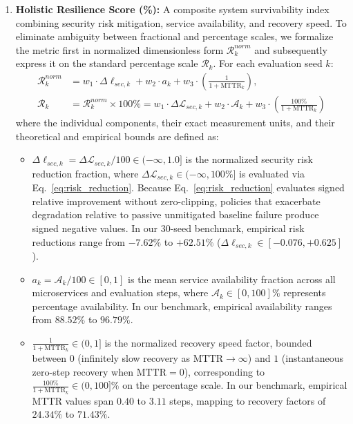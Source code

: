 \documentclass[ASNA,twocolumn]{USG}
\begin{document}
\begin{enumerate}
    \item \textbf{Holistic Resilience Score (\%):} A composite system survivability index combining security risk mitigation, service availability, and recovery speed. To eliminate ambiguity between fractional and percentage scales, we formalize the metric first in normalized dimensionless form $\mathcal{R}_k^{norm}$ and subsequently express it on the standard percentage scale $\mathcal{R}_k$. For each evaluation seed $k$:
    \begin{align}
        \mathcal{R}_k^{norm} &= w_1 \cdot \Delta \ell_{sec, k} + w_2 \cdot a_k + w_3 \cdot \left(\frac{1}{1 + \text{MTTR}_k}\right), \label{eq:resilience_norm} \\
        \mathcal{R}_k &= \mathcal{R}_k^{norm} \times 100\% = w_1 \cdot \Delta \mathcal{L}_{sec, k} + w_2 \cdot \mathcal{A}_k + w_3 \cdot \left(\frac{100\%}{1 + \text{MTTR}_k}\right) \label{eq:resilience_pct}
    \end{align}
    where the individual components, their exact measurement units, and their theoretical and empirical bounds are defined as:
    \begin{itemize}
        \item $\Delta \ell_{sec, k} = \Delta \mathcal{L}_{sec, k} / 100 \in (-\infty, 1.0]$ is the normalized security risk reduction fraction, where $\Delta \mathcal{L}_{sec, k} \in (-\infty, 100\%]$ is evaluated via Eq.~\eqref{eq:risk_reduction}. Because Eq.~\eqref{eq:risk_reduction} evaluates signed relative improvement without zero-clipping, policies that exacerbate degradation relative to passive unmitigated baseline failure produce signed negative values. In our 30-seed benchmark, empirical risk reductions range from $-7.62\%$ to $+62.51\%$ ($\Delta \ell_{sec, k} \in [-0.076, +0.625]$).
        \item $a_k = \mathcal{A}_k / 100 \in [0, 1]$ is the mean service availability fraction across all microservices and evaluation steps, where $\mathcal{A}_k \in [0, 100]\%$ represents percentage availability. In our benchmark, empirical availability ranges from $88.52\%$ to $96.79\%$.
        \item $\frac{1}{1 + \text{MTTR}_k} \in (0, 1]$ is the normalized recovery speed factor, bounded between $0$ (infinitely slow recovery as $\text{MTTR} \to \infty$) and $1$ (instantaneous zero-step recovery when $\text{MTTR} = 0$), corresponding to $\frac{100\%}{1 + \text{MTTR}_k} \in (0, 100]\%$ on the percentage scale. In our benchmark, empirical MTTR values span $0.40$ to $3.11$ steps, mapping to recovery factors of $24.34\%$ to $71.43\%$.

\end{itemize}
\end{enumerate}
\end{document}
